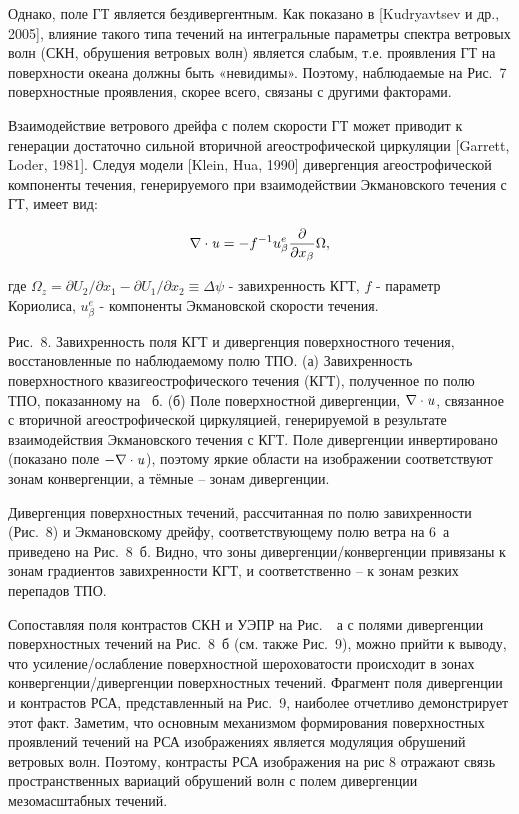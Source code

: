Однако, поле ГТ является бездивергентным. Как показано в [Kudryavtsev и др., 2005], влияние такого типа течений на интегральные параметры спектра ветровых волн (СКН, обрушения ветровых волн) является слабым, т.е. проявления ГТ на поверхности океана должны быть «невидимы». Поэтому, наблюдаемые на Рис.~7 поверхностные проявления, скорее всего, связаны с другими факторами. 

Взаимодействие ветрового дрейфа с полем скорости ГТ может приводит к генерации достаточно сильной вторичной агеострофической циркуляции [Garrett, Loder, 1981]. Следуя модели [Klein, Hua, 1990] дивергенция агеострофической компоненты течения, генерируемого при взаимодействии Экмановского течения с ГТ, имеет вид:

\begin{equation} \label{7)} \nabla \cdot {\it u}=-f^{-1} u_{\beta }^{e} \frac{\partial }{\partial x_{\beta } } \Omega ,  \end{equation} 

где $\Omega _{z} =\partial U_{2} /\partial x_{1} -\partial U_{1} /\partial x_{2} \equiv \Delta \psi $ - завихренность КГТ, $f$ - параметр Кориолиса, $u_{\beta }^{e} $ - компоненты Экмановской скорости течения.





Рис.~8. Завихренность поля КГТ и дивергенция поверхностного течения, восстановленные по наблюдаемому полю ТПО. (а) Завихренность поверхностного квазигеострофического течения (КГТ), полученное по полю ТПО, показанному на ~б. (б) Поле поверхностной дивергенции, $\nabla \cdot {\it u}$, связанное с вторичной агеострофической циркуляцией, генерируемой  в результате взаимодействия Экмановского течения  с КГТ. Поле дивергенции инвертировано (показано поле $-\nabla \cdot {\it u}$), поэтому яркие области на изображении соответствуют зонам конвергенции, а тёмные -- зонам дивергенции.



Дивергенция поверхностных течений, рассчитанная по полю завихренности (Рис.~8) и Экмановскому дрейфу, соответствующему полю ветра на 6~а приведено на Рис.~8~б. Видно, что зоны дивергенции/конвергенции привязаны к зонам градиентов завихренности КГТ, и соответственно -- к зонам резких перепадов ТПО.

Сопоставляя поля контрастов СКН и УЭПР на Рис.~~а с полями дивергенции поверхностных течений на Рис.~8~б (см. также Рис.~9), можно прийти к выводу, что усиление/ослабление поверхностной шероховатости происходит в зонах конвергенции/дивергенции поверхностных течений. Фрагмент поля дивергенции и контрастов РСА, представленный на Рис.~9, наиболее отчетливо демонстрирует этот факт. Заметим, что основным механизмом формирования поверхностных проявлений течений на РСА изображениях является модуляция обрушений ветровых волн. Поэтому, контрасты РСА изображения на рис 8 отражают связь пространственных вариаций обрушений волн с полем дивергенции мезомасштабных течений. 

